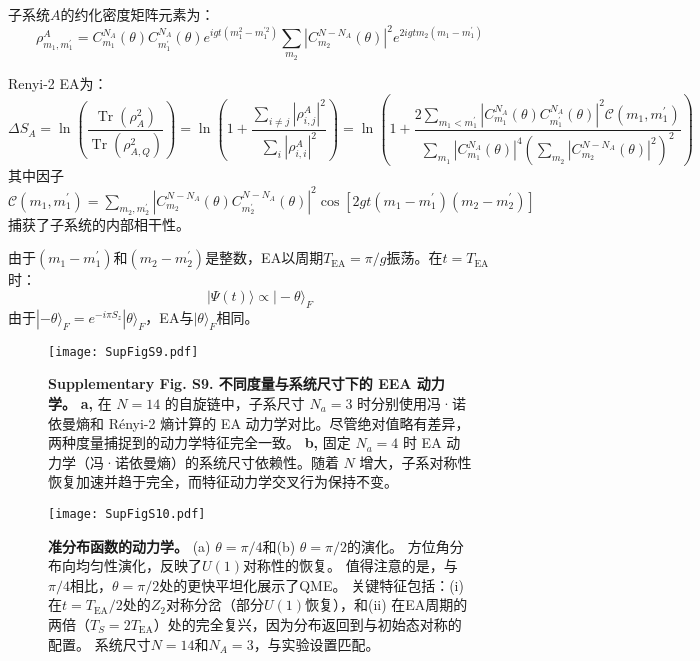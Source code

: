 \documentclass[11pt,a4paper]{article}
\begin{document}
子系统$A$的约化密度矩阵元素为：
\[
\rho^{A}_{m_1,m^{\prime}_1} = C^{N_A}_{m_1}(\theta) C^{N_A}_{m^{\prime}_1}(\theta) e^{igt(m_1^2-m^{\prime 2}_1)} \sum_{m_2} |C^{N-N_A}_{m_2}(\theta)|^2 e^{2igtm_2(m_1-m^{\prime}_1)}
\]

Renyi-2 EA为：
\[
\Delta S_A = \ln\left(\frac{\operatorname{Tr}(\rho^2_A)}{\operatorname{Tr}(\rho^2_{A,Q})}\right)
= \ln\left(1 + \frac{\sum_{i\neq j}|\rho^A_{i,j}|^2}{\sum_{i}|\rho^A_{i,i}|^2}\right)
= \ln\left(1 + \frac{2\sum_{m_1<m^{\prime}_1}|C^{N_A}_{m_1}(\theta)C^{N_A}_{m^{\prime}_1}(\theta)|^2 \mathcal{C}(m_1,m^{\prime}_1)}{\sum_{m_1}|C^{N_A}_{m_1}(\theta)|^4 \left(\sum_{m_2}|C^{N-N_A}_{m_2}(\theta)|^2\right)^2}\right)
\]
其中因子$\mathcal{C}(m_1,m^{\prime}_1) = \sum_{m_2,m^{\prime}_2}|C^{N-N_A}_{m_2}(\theta)C^{N-N_A}_{m^{\prime}_2}(\theta)|^2 \cos[2gt(m_1-m^{\prime}_1)(m_2-m^{\prime}_2)]$捕获了子系统的内部相干性。

由于$(m_1-m^{\prime}_1)$和$(m_2-m^{\prime}_2)$是整数，EA以周期$T_{\text{EA}} = \pi/g$振荡。在$t=T_{\text{EA}}$时：
\[
|\Psi(t)\rangle \propto |-\theta\rangle_F
\]
由于$|-\theta\rangle_F = e^{-i\pi S_z}|\theta\rangle_F$，EA与$|\theta\rangle_F$相同。

\begin{figure}[H]
    \centering
    \texttt{[image: SupFigS9.pdf]}
    \caption{
    \textbf{Supplementary Fig. S9. 不同度量与系统尺寸下的 EEA 动力学。}
    \textbf{a,} 在 $N = 14$ 的自旋链中，子系尺寸 $N_a = 3$ 时分别使用冯·诺依曼熵和 Rényi-2 熵计算的 EA 动力学对比。尽管绝对值略有差异，两种度量捕捉到的动力学特征完全一致。
    \textbf{b,} 固定 $N_a = 4$ 时 EA 动力学（冯·诺依曼熵）的系统尺寸依赖性。随着 $N$ 增大，子系对称性恢复加速并趋于完全，而特征动力学交叉行为保持不变。
    }
    \label{fig:S9}
\end{figure}

\begin{figure}[H]
    \centering
    \texttt{[image: SupFigS10.pdf]}
    \caption{
        \textbf{准分布函数的动力学。}
        (a) $\theta=\pi/4$和(b) $\theta=\pi/2$的演化。
        方位角分布向均匀性演化，反映了$U(1)$对称性的恢复。
        值得注意的是，与$\pi/4$相比，$\theta=\pi/2$处的更快平坦化展示了QME。
        关键特征包括：(i) 在$t=T_{\text{EA}}/2$处的$Z_2$对称分岔（部分$U(1)$恢复），和(ii) 在EA周期的两倍（$T_S=2T_{\text{EA}}$）处的完全复兴，因为分布返回到与初始态对称的配置。
        系统尺寸$N=14$和$N_A=3$，与实验设置匹配。
    }
    \label{fig:quasidistribution_dynamics}
\end{figure}
\end{document}
